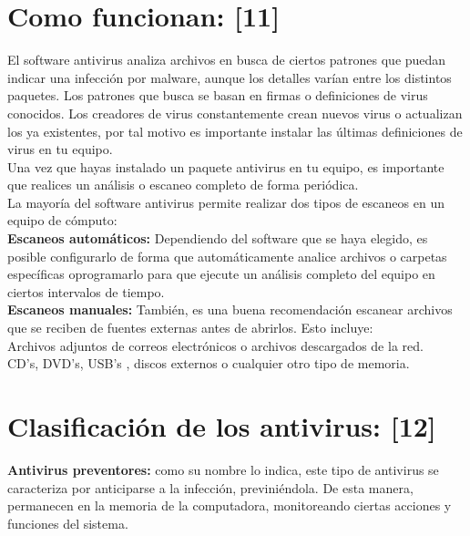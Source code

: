 \documentclass[12pt,a4paper]{article}
\begin{document}
	\section{Como funcionan: [11]}
	
	El software antivirus analiza archivos en busca de ciertos patrones que puedan indicar una infección por malware, aunque los detalles varían entre los distintos paquetes. Los patrones que busca se basan en firmas o definiciones de virus conocidos. Los creadores de virus constantemente crean nuevos virus o actualizan los ya existentes, por tal motivo es importante instalar las últimas definiciones de virus en tu equipo.\\
	
	Una vez que hayas instalado un paquete antivirus en tu equipo, es importante que realices un análisis o escaneo completo de forma periódica.\\
	
	La mayoría del software antivirus permite realizar dos tipos de escaneos en un equipo de cómputo:\\
	
	\textbf{Escaneos automáticos:} Dependiendo del software que se haya elegido, es posible configurarlo de forma que automáticamente analice archivos o carpetas específicas oprogramarlo para que ejecute un análisis completo del equipo en ciertos intervalos de tiempo.\\
	
	\textbf{Escaneos manuales:} También, es una buena recomendación escanear archivos que se reciben de fuentes externas antes de abrirlos. Esto incluye:\\
	
	Archivos adjuntos de correos electrónicos o archivos descargados de la red.\\
	
	CD's, DVD's, USB's , discos externos o cualquier otro tipo de memoria.
	
	\section{Clasificación de los antivirus: [12]}
	
	\textbf{Antivirus preventores:} como su nombre lo indica, este tipo de antivirus se caracteriza por anticiparse a la infección, previniéndola. De esta manera, permanecen en la memoria de la computadora, monitoreando ciertas acciones y funciones del sistema.\\
	
\end{document}

